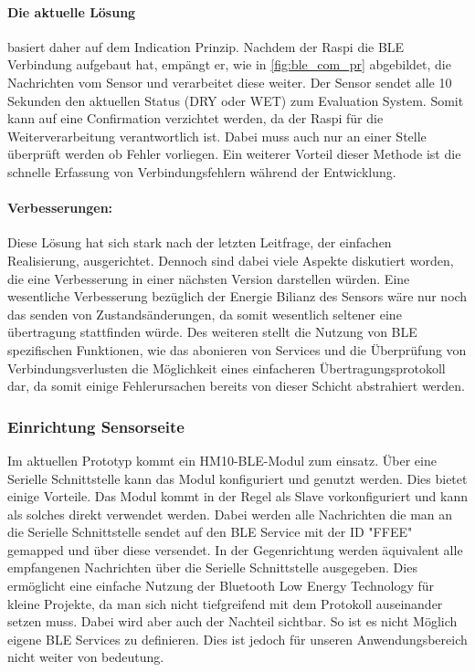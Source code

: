 \paragraph{Die aktuelle Lösung} basiert daher auf dem Indication Prinzip. Nachdem der Raspi die BLE Verbindung aufgebaut hat, empängt er, wie in \ref{fig:ble_com_pr} abgebildet, die Nachrichten vom Sensor und verarbeitet diese weiter. Der Sensor sendet alle 10 Sekunden den aktuellen Status (DRY oder WET) zum Evaluation System. Somit kann auf eine Confirmation verzichtet werden, da der Raspi für die Weiterverarbeitung verantwortlich ist. Dabei muss auch nur an einer Stelle überprüft werden ob Fehler vorliegen. Ein weiterer Vorteil dieser Methode ist die schnelle Erfassung von Verbindungsfehlern während der Entwicklung.

\paragraph{Verbesserungen:} Diese Lösung hat sich stark nach der letzten Leitfrage, der einfachen Realisierung, ausgerichtet. Dennoch sind dabei viele Aspekte diskutiert worden, die eine Verbesserung in einer nächsten Version darstellen würden. Eine wesentliche Verbesserung bezüglich der Energie Bilianz des Sensors wäre nur noch das senden von Zustandsänderungen, da somit wesentlich seltener eine übertragung stattfinden würde. Des weiteren stellt die Nutzung von BLE spezifischen Funktionen, wie das abonieren von Services und die Überprüfung von Verbindungsverlusten die Möglichkeit eines einfacheren Übertragungsprotokoll dar, da somit einige Fehlerursachen bereits von dieser Schicht abstrahiert werden.

\subsubsection{Einrichtung Sensorseite}
Im aktuellen Prototyp kommt ein HM10-BLE-Modul zum einsatz. Über eine Serielle Schnittstelle kann das Modul konfiguriert und genutzt werden. Dies bietet einige Vorteile. Das Modul kommt in der Regel als Slave vorkonfiguriert und kann als solches direkt verwendet werden. Dabei werden alle Nachrichten die man an die Serielle Schnittstelle sendet auf den BLE Service mit der ID "FFEE" gemapped und über diese versendet. In der Gegenrichtung werden äquivalent alle empfangenen Nachrichten über die Serielle Schnittstelle ausgegeben. Dies ermöglicht eine einfache Nutzung der Bluetooth Low Energy Technology für kleine Projekte, da man sich nicht tiefgreifend mit dem Protokoll auseinander setzen muss. Dabei wird aber auch der Nachteil sichtbar. So ist es nicht Möglich eigene BLE Services zu definieren. Dies ist jedoch für unseren Anwendungsbereich nicht weiter von bedeutung. 


